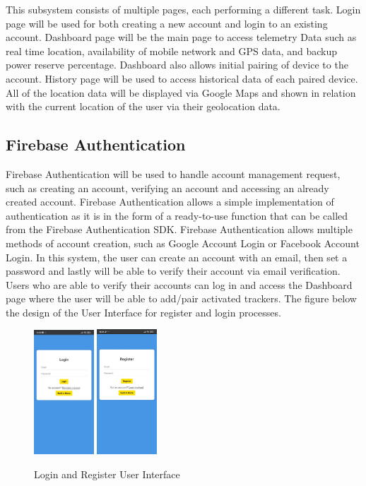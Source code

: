 \documentclass[conference]{IEEEtran}
\begin{document}
This subsystem consists of multiple pages, each performing a different task. Login page will be used for both creating a new account and login to an existing account. Dashboard page will be the main page to access telemetry Data such as real time location, availability of mobile network and GPS data, and backup power reserve percentage. Dashboard also allows initial pairing of device to the account.
History page will be used to access historical data of each paired device. All of the location data will be displayed via Google Maps and shown in relation with the current location of the user via their geolocation data. 

\subsection{Firebase Authentication}\label{AA}
Firebase Authentication will be used to handle account management request, such as creating an account, verifying an account and accessing an already created account. Firebase Authentication allows a simple implementation of authentication as it is in the form of a ready-to-use function that can be called from the Firebase Authentication SDK. Firebase Authentication allows multiple methods of 
account creation, such as Google Account Login or Facebook Account Login.
In this system, the user can create an account with an email, then set a password and lastly will be able to verify their account via email verification. Users who are able to verify their accounts 
can log in and access the Dashboard page where the user will be able to add/pair activated trackers. The figure below the design of the User Interface for register and login processes.
\begin{figure}[htbp]
    \centering
    \includegraphics[width=0.2\textwidth]{tampilanlogin}
    \includegraphics[width=0.2\textwidth]{tampilanregister}
    \caption{Login and Register User Interface}
    \label{fig1}
\end{figure}
\end{document}
